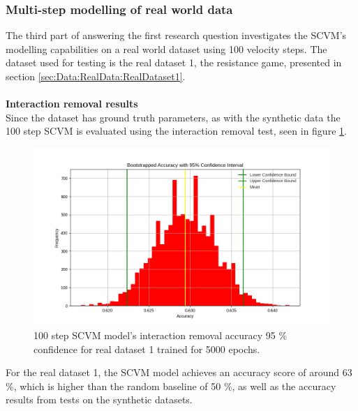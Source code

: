 \subsubsection{Multi-step modelling of real world data}
\label{sec:ResearchQuestion1:ResistanceTraining}
The third part of answering the first research question investigates the SCVM's modelling capabilities on a real world dataset using 100 velocity steps. 
The dataset used for testing is the real dataset 1, the resistance game, presented in section \ref{sec:Data:RealData:RealDataset1}.
\\\\
\textbf{Interaction removal results}
\\
Since the dataset has ground truth parameters, as with the synthetic data the 100 step SCVM is evaluated using the interaction removal test, seen in figure \ref{fig:RQ1:real_SCVM_accuracy}.
\begin{figure}[H]
    \centering
    \includegraphics[width=\textwidth]{0_images/100steps_SCVM_real_dataset_accuracy_plot.png}
    \caption{100 step SCVM model's interaction removal accuracy 95 \% confidence for real dataset 1 trained for 5000 epochs.}
    \label{fig:RQ1:real_SCVM_accuracy}
\end{figure}
\noindent
For the real dataset 1, the SCVM model achieves an accuracy score of around 63 \%, which is higher than the random baseline of 50 \%, as well as the accuracy results from tests on the synthetic datasets.